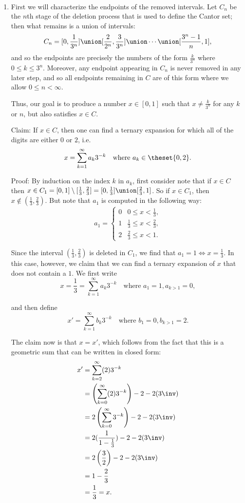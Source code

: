 \begin{solution}\hfill\\
  \begin{enumerate}
    \item First we will characterize the endpoints of the removed intervals. Let $C_n$ be the $n$th stage of the deletion process that is used to define the Cantor set; then what remains is a union of intervals:
      $$
      C_n = [0, \frac 1 {3^n}] \union [\frac 2 {2^n}, \frac 3 {3^n}] \union \cdots \union[\frac {3^n-1} n, 1],
      $$
    and so the endpoints are precisely the numbers of the form $\frac{k}{3^n}$ where $0 \leq k \leq 3^n$. Moreover, any endpoint appearing in $C_n$ is never removed in any later step, and so all endpoints remaining in $C$ are of this form where we allow $0\leq n < \infty$.

    Thus, our goal is to produce a number $x\in [0,1]$ such that $x \neq \frac k {3^n}$ for any $k$ or $n$, but also satisfies $x\in C$.

    Claim: If $x\in C$, then one can find a ternary expansion for which all of the digits are either $0$ or $2$, i.e.
    $$
    x = \sum_{k=1}^\infty a_k 3^{-k} \quad \text{where } a_k \in \theset{0, 2}.
    $$

    Proof: By induction on the index $k$ in $a_k$, first consider note that if $x\in C$ then $x \in C_1 = [0, 1] \setminus [\frac 1 3, \frac 2 3]= [0, \frac 1 3] \union [\frac 2 3, 1]$. So if $x\in C_1$, then $x\not\in(\frac 1 3, \frac 2 3)$. But note that $a_1$ is computed in the following way:
    $$
    a_1 = \begin{cases}
      0 & 0 \leq x < \frac 1 3, \\
      1 & \frac 1 3 \leq x < \frac 2 3, \\
      2 & \frac 2 3 \leq x < 1.
    \end{cases}
    $$

    Since the interval $(\frac 1 3, \frac 2 3)$ is deleted in $C_1$, we find that $a_1 = 1 \iff x = \frac 1 3$. In this case, however, we claim that we can find a ternary expansion of $x$ that does not contain a $1$.  We first write
    $$
    x = \frac 1 3 = \sum_{k=1}^\infty a_k 3^{-k} \quad \text{where } a_1 = 1, a_{k>1} = 0,
    $$

    and then define
    $$
    x' = \sum_{k=1}^\infty b_k 3^{-k} \quad\text{where } b_1 = 0, b_{k>1} = 2.
    $$

    The claim now is that $x=x'$, which follows from the fact that this is a geometric sum that can be written in closed form:
    \begin{align*}
      x' &= \sum_{k=2}^\infty (2) 3^{-k} \\
      & = \left( \sum_{k=0}^\infty (2)3^{-k} \right) - 2 - 2(3\inv) \\
      & = 2\left( \sum_{k=0}^\infty 3^{-k} \right) - 2 - 2(3\inv) \\
      &= 2 (\frac 1 {1 - \frac 1 3}) - 2 - 2(3\inv) \\
      &= 2 \left(\frac 3 2\right) - 2 - 2(3\inv) \\
      &= 1 - \frac 2 3 \\
      &= \frac 1 3 = x.
    \end{align*}


\end{enumerate}
\end{solution}
